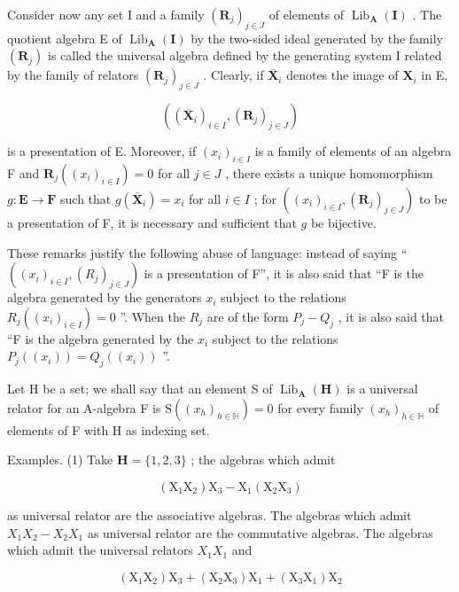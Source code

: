 Consider now any set I and a family \((\mathbf{R}_j)_{j\in J}\) of elements of \(\operatorname{Lib}_{\mathbf{A}}(\mathbf{I})\) . The quotient algebra E of \(\operatorname{Lib}_{\mathbf{A}}(\mathbf{I})\) by the two-sided ideal generated by the family \((\mathbf{R}_j)\) is called the universal algebra defined by the generating system I related by the family of relators \((\mathbf{R}_j)_{j\in J}\) . Clearly, if \(\overline{\mathbf{X}}_i\) denotes the image of \(\mathbf{X}_i\) in E,

\[
\left(\left(\overline {{\mathbf {X}}} _ {i}\right) _ {i \in I}, \left(\mathbf {R} _ {j}\right) _ {j \in J}\right)
\]

is a presentation of E. Moreover, if \((x_{i})_{i\in I}\) is a family of elements of an algebra F and \(\mathbf{R}_j((x_i)_{i\in I}) = 0\) for all \(j\in J\) , there exists a unique homomorphism \(g:\mathbf{E}\to \mathbf{F}\) such that \(g(\overline{\mathbf{X}}_i) = x_i\) for all \(i\in I\) ; for \(((x_i)_{i\in I},(\mathbf{R}_j)_{j\in J})\) to be a presentation of F, it is necessary and sufficient that \(g\) be bijective.

These remarks justify the following abuse of language: instead of saying `` \(((x_i)_{i \in I}, (R_j)_{j \in J})\) is a presentation of F'', it is also said that ``F is the algebra generated by the generators \(x_i\) subject to the relations \(R_j((x_i)_{i \in I}) = 0\) ''. When the \(R_j\) are of the form \(P_j - Q_j\) , it is also said that ``F is the algebra generated by the \(x_i\) subject to the relations \(P_j((x_i)) = Q_j((x_i))\) ''.

Let H be a set; we shall say that an element S of \(\operatorname{Lib}_{\mathbf{A}}(\mathbf{H})\) is a universal relator for an A-algebra F is \(\mathrm{S}((x_{h})_{h\in\mathbb{H}})=0\) for every family \((x_{h})_{h\in\mathbb{H}}\) of elements of F with H as indexing set.

Examples. (1) Take \(\mathbf{H} = \{1,2,3\}\) ; the algebras which admit

\[
(\mathrm{X} _ {1} \mathrm{X} _ {2}) \mathrm{X} _ {3} - \mathrm{X} _ {1} (\mathrm{X} _ {2} \mathrm{X} _ {3})
\]

as universal relator are the associative algebras. The algebras which admit \(X_{1}X_{2}-X_{2}X_{1}\) as universal relator are the commutative algebras. The algebras which admit the universal relators \(X_{1}X_{1}\) and

\[
(\mathrm{X} _ {1} \mathrm{X} _ {2}) \mathrm{X} _ {3} + (\mathrm{X} _ {2} \mathrm{X} _ {3}) \mathrm{X} _ {1} + (\mathrm{X} _ {3} \mathrm{X} _ {1}) \mathrm{X} _ {2}
\]

